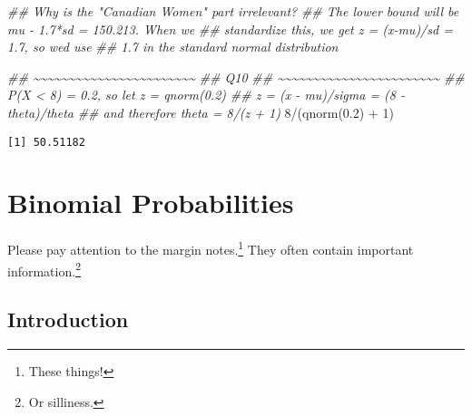 \documentclass[
  letterpaper,
  DIV=11,
  numbers=noendperiod]{scrreprt}
\newenvironment{Shaded}{\begin{snugshade}}{\end{snugshade}}
\newcommand{\DecValTok}[1]{\textcolor[rgb]{0.68,0.00,0.00}{#1}}
\newcommand{\DocumentationTok}[1]{\textcolor[rgb]{0.37,0.37,0.37}{\textit{#1}}}
\newcommand{\FloatTok}[1]{\textcolor[rgb]{0.68,0.00,0.00}{#1}}
\newcommand{\FunctionTok}[1]{\textcolor[rgb]{0.28,0.35,0.67}{#1}}
\newcommand{\NormalTok}[1]{\textcolor[rgb]{0.00,0.23,0.31}{#1}}
\newcommand{\SpecialCharTok}[1]{\textcolor[rgb]{0.37,0.37,0.37}{#1}}
\begin{document}
\begin{Shaded}
\begin{Highlighting}[]
\DocumentationTok{\#\# Why is the "Canadian Women" part irrelevant?}
\DocumentationTok{\#\# The lower bound will be mu {-} 1.7*sd = 150.213. When we}
\DocumentationTok{\#\# standardize this, we get z = (x{-}mu)/sd = 1.7, so we\textquotesingle{}d use}
\DocumentationTok{\#\# 1.7 in the standard normal distribution}

\DocumentationTok{\#\# \textasciitilde{}\textasciitilde{}\textasciitilde{}\textasciitilde{}\textasciitilde{}\textasciitilde{}\textasciitilde{}\textasciitilde{}\textasciitilde{}\textasciitilde{}\textasciitilde{}\textasciitilde{}\textasciitilde{}\textasciitilde{}\textasciitilde{}\textasciitilde{}\textasciitilde{}\textasciitilde{}\textasciitilde{}\textasciitilde{}\textasciitilde{}\textasciitilde{}\textasciitilde{}}
\DocumentationTok{\#\# Q10}
\DocumentationTok{\#\# \textasciitilde{}\textasciitilde{}\textasciitilde{}\textasciitilde{}\textasciitilde{}\textasciitilde{}\textasciitilde{}\textasciitilde{}\textasciitilde{}\textasciitilde{}\textasciitilde{}\textasciitilde{}\textasciitilde{}\textasciitilde{}\textasciitilde{}\textasciitilde{}\textasciitilde{}\textasciitilde{}\textasciitilde{}\textasciitilde{}\textasciitilde{}\textasciitilde{}\textasciitilde{}}
\DocumentationTok{\#\# P(X \textless{} 8) = 0.2, so let z = qnorm(0.2)}
\DocumentationTok{\#\# z = (x {-} mu)/sigma = (8 {-} theta)/theta}
\DocumentationTok{\#\# and therefore theta = 8/(z + 1)}
\DecValTok{8}\SpecialCharTok{/}\NormalTok{(}\FunctionTok{qnorm}\NormalTok{(}\FloatTok{0.2}\NormalTok{) }\SpecialCharTok{+} \DecValTok{1}\NormalTok{)}
\end{Highlighting}
\end{Shaded}

\begin{verbatim}
[1] 50.51182
\end{verbatim}

\hypertarget{binomial-probabilities}{%
\chapter{Binomial Probabilities}\label{binomial-probabilities}}

Please pay attention to the margin notes.\footnote{These things!} They
often contain important information.\footnote{Or silliness.}

\hypertarget{introduction-4}{%
\section{Introduction}\label{introduction-4}}
\end{document}

